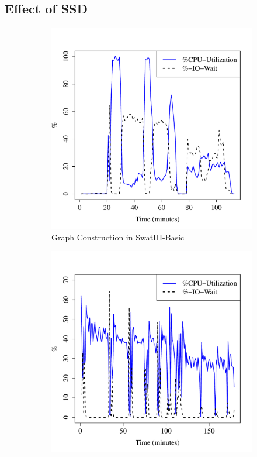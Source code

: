 \documentclass[conference]{IEEEtran}
\begin{document}
\subsection {Effect of SSD} \label{EffectOfSSD}
\begin{figure}[htb]
\centering
        \begin{subfigure}[b]{0.3\textwidth}
                \includegraphics[width=\textwidth]{Figure/SystemData/Plots/BGCPUHDD.pdf}
                \caption{Graph Construction in SwatIII-Basic}
                \label{fig:BGCPUHDD}
        \end{subfigure}
		\begin{subfigure}[b]{0.3\textwidth}
                \includegraphics[width=\textwidth]{Figure/SystemData/Plots/ECCPUHDD.pdf}

\end{subfigure}
\end{figure}
\end{document}
